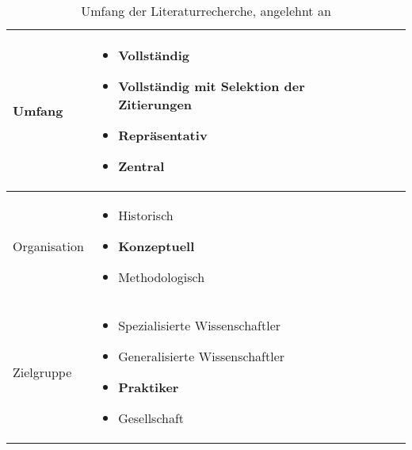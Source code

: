\begin{table}[h]
\begin{tabular}[h]{p{3.5cm}|p{8cm} l|l}
\hline
Umfang & \begin{itemize}[nosep, leftmargin=*, before=\vspace{-0.5\baselineskip},after =\vspace{-\baselineskip}]
\item Vollständig
\item Vollständig mit Selektion der Zitierungen
\item \textbf{Repräsentativ}
\item Zentral
\end{itemize} \\
\hline
Organisation & \begin{itemize}[nosep, leftmargin=*, before=\vspace{-0.5\baselineskip},after =\vspace{-\baselineskip}]
\item Historisch
\item \textbf{Konzeptuell}
\item Methodologisch
\end{itemize} \\
\hline
Zielgruppe & \begin{itemize}[nosep, leftmargin=*, before=\vspace{-0.5\baselineskip},after =\vspace{-\baselineskip}]
\item Spezialisierte Wissenschaftler
\item Generalisierte Wissenschaftler
\item \textbf{Praktiker}
\item Gesellschaft
\end{itemize} \\
\end{tabular}
\caption{\label{tab:taxonomyCooper} Umfang der Literaturrecherche, angelehnt an \cite{cooper_organizing_1988}}
\end{table}

